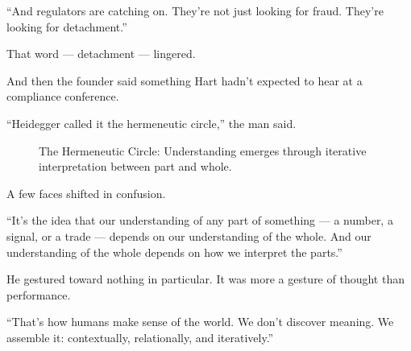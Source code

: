 ``And regulators are catching on.
They’re not just looking for fraud.
They’re looking for detachment.''

That word --- detachment --- lingered.

And then the founder said something Hart hadn’t expected to hear at a compliance conference.

``Heidegger called it the hermeneutic circle,'' the man said.

\begin{figure}[H]
  \centering
  \caption{The Hermeneutic Circle: Understanding emerges through iterative interpretation between part and whole.}
\end{figure}


A few faces shifted in confusion.

``It’s the idea that our understanding of any part of something 
--- a number, a signal, or a trade --- 
depends on our understanding of the whole. 
And our understanding of the whole depends on how we interpret the parts.''

He gestured toward nothing in particular. It was more a gesture of thought than performance.

``That’s how humans make sense of the world.
We don’t discover meaning. We assemble it: contextually, relationally, and iteratively.''




